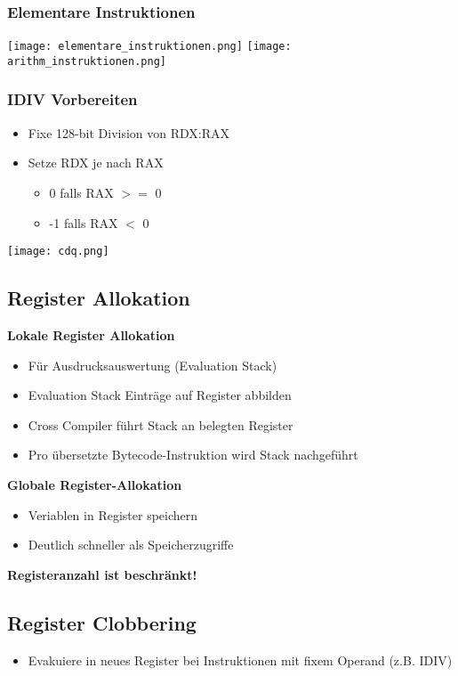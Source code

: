 \subsubsection{Elementare Instruktionen}
\texttt{[image: elementare\_instruktionen.png]}
\texttt{[image: arithm\_instruktionen.png]}

\subsubsection{IDIV Vorbereiten}
\begin{itemize}
    \item Fixe 128-bit Division von RDX:RAX
    \item Setze RDX je nach RAX
    \begin{itemize}
        \item 0 falls RAX $>=$ 0
        \item -1 falls RAX $<$ 0
    \end{itemize}
\end{itemize}
\texttt{[image: cdq.png]}

\subsection{Register Allokation}
\textbf{Lokale Register Allokation}
\begin{itemize}
    \item Für Ausdrucksauswertung (Evaluation Stack)
    \item Evaluation Stack Einträge auf Register abbilden
    \item Cross Compiler führt Stack an belegten Register 
    \item Pro übersetzte Bytecode-Instruktion wird Stack nachgeführt
\end{itemize}
\textbf{Globale Register-Allokation}
\begin{itemize}
    \item Veriablen in Register speichern
    \item Deutlich schneller als Speicherzugriffe
\end{itemize}
\textbf{Registeranzahl ist beschränkt!}

\subsection{Register Clobbering}
\begin{itemize}
    \item Evakuiere in neues Register bei Instruktionen mit fixem Operand (z.B. IDIV)
\end{itemize}
